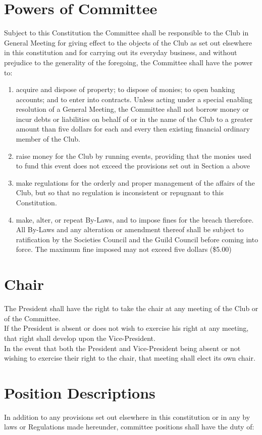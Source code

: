 \documentclass[10pt,a4paper]{report}
\begin{document}
	\section{Powers of Committee}
	Subject to this Constitution the Committee shall be responsible to the Club in General Meeting for giving effect to the objects of the Club as set out elsewhere in this constitution and for carrying out its everyday business, and without prejudice to the generality of the foregoing, the Committee shall have the power to:
	\begin{enumerate}[label=\alph*]
		\item acquire and dispose of property; to dispose of monies; to open banking accounts; and to enter into contracts. Unless acting under a special enabling resolution of a General Meeting, the Committee shall not borrow money or incur debts or liabilities on behalf of or in the name of the Club to a greater amount than five dollars for each and every then existing financial ordinary member of the Club.
		\item raise money for the Club by running events, providing that the monies used to fund this event does not exceed the provisions set out in Section a above
		\item make regulations for the orderly and proper management of the affairs of the Club, but so that no regulation is inconsistent or repugnant to this Constitution.
		\item make, alter, or repeat By-Laws, and to impose fines for the breach therefore. All By-Laws and any alteration or amendment thereof shall be subject to ratification by the Societies Council and the Guild Council before coming into force. The maximum fine imposed may not exceed five dollars (\$5.00)
	\end{enumerate}

	\section{Chair}
	The President shall have the right to take the chair at any meeting of the Club or of the Committee. \\
	If the President is absent or does not wish to exercise his right at any meeting, that right shall develop upon the Vice-President. \\
	In the event that both the President and Vice-President being absent or not wishing to exercise their right to the chair, that meeting shall elect its own chair.

	\section{Position Descriptions}
	In addition to any provisions set out elsewhere in this constitution or in any by laws or Regulations made hereunder, committee positions shall have the duty of:
\end{document}
